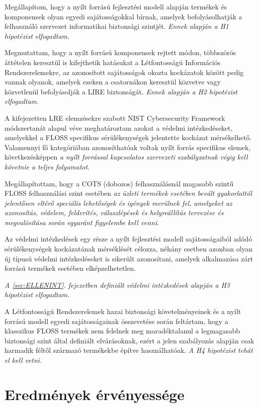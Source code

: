 \documentclass[12pt,magyar,a4paper,oneside]{scrreprt}
\begin{document}
Megállapítom, hogy a nyílt forrású fejlesztési modell alapján termékek
és komponensek olyan egyedi sajátosságokkal bírnak, amelyek
befolyásolhatják a felhasználó szervezet informatikai biztonsági
szintjét. \emph{Ennek alapján a H1 hipotézist elfogadtam.}

Megmutattam, hogy a nyílt forrású komponensek rejtett módon, többszörös
áttételen keresztül is kifejthetik hatásukat a Létfontosságú Információs
Rendszerelemekre, az azonosított sajátosságok okozta kockázatok között
pedig vannak olyanok, amelyek ezeken a csatornákon keresztül közvetve
vagy közvetlenül befolyásolják a LIRE biztonságát. \emph{Ennek alapján a
H2 hipotézist elfogadtam.}

A kifejezetten LRE elemzésekre szabott NIST Cybersecurity Framework
módszertanát alapul véve meghatároztam azokat a védelmi intézkedéseket,
amelyekkel a FLOSS specifikus sérülékenységek jelentette kockázat
mérsékelhető. Valamennyi fő kategóriában azonosíthatóak voltak nyílt
forrás specifikus elemek, következésképpen \emph{a nyílt forrással
kapcsolatos szervezeti szabályzatnak végig kell követnie a teljes
folyamatot}.

Megállapítottam, hogy a COTS (dobozos) felhasználásnál magasabb szintű
FLOSS felhasználási szint esetében \emph{az üzleti termékek esetében
bevált gyakorlattól jelentősen eltérő speciális lehetőségek és igények
merülnek fel, amelyeket az azonosítás, védelem, felderítés,
válaszlépések és helyreállítás tervezése és megvalósítása során egyaránt
figyelembe kell venni}.

Az védelmi intézkedések egy része a nyílt fejlesztési modell
sajátosságaiból adódó sérülékenységek kockázatának mérséklését célozza,
néhány esetben azonban olyan új típusú védelmi intézkedéseket is
sikerült azonosítani, amelyek alkalmazása zárt forrású termékek esetében
elképzelhetetlen.

\emph{A \ref{sec:ELLENINT}. fejezetben definiált védelmi intézkedések
alapján a H3 hipotézist elfogadtam.}

A Létfontosságú Rendszerelemek hazai biztonsági követelményeinek és a
nyílt forrású modell egyedi sajátosságainak összevetése során feltártam,
hogy a klasszikus FLOSS termékek nem felelnek meg maradéktalanul a
legmagasabb biztonsági szint által definiált elvárásoknak, ezért a jelen
szabályozás alapján csak harmadik féltől származó termékekbe építve
használhatóak. \emph{A H4 hipotézist tehát el kell vetni.}

\hypertarget{eredmuxe9nyek-uxe9rvuxe9nyessuxe9ge}{%
\section{Eredmények
érvényessége}\label{eredmuxe9nyek-uxe9rvuxe9nyessuxe9ge}}
\end{document}

